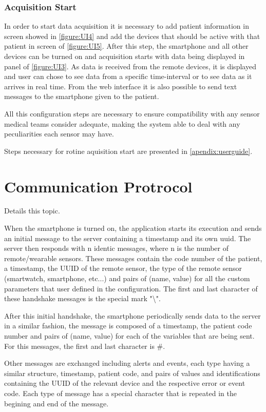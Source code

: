 \subsubsection{Acquisition Start}

In order to start data acquisition it is necessary to add patient information in screen showed in \cref{figure:UI4} and add the devices that should be active with that patient in screen of \cref{figure:UI5}. After this step, the smartphone and all other devices can be turned on and acquisition starts with data being displayed in panel of \cref{figure:UI3}. As data is received from the remote devices, it is displayed and user can chose to see data from a specific time-interval or to see data as it arrives in real time. From the web interface it is also possible to send text messages to the smartphone given to the patient.

All this configuration steps are necessary to ensure compatibility with any sensor medical teams consider adequate, making the system able to deal with any peculiarities each sensor may have.

Steps necessary for rotine aquisition start are presented in \cref{apendix:userguide}.

\section{Communication Protrocol}

 Details this topic.

When the smartphone is turned on, the application starts its execution and sends an initial message to the server containing a timestamp and its own \ac{uuid}. The server then responds with n identic messages, where n is the number of remote/wearable sensors. These messages contain the code number of the patient, a timestamp, the UUID of the remote sensor, the type of the remote sensor (smartwatch, smartphone, etc...) and pairs of (name, value) for all the custom parameters that user defined in the configuration.
The first and last character of these handshake messages is the special mark "\textbackslash".

After this initial handshake, the smartphone periodically sends data to the server in a similar fashion, the message is composed of a timestamp, the patient code number and pairs of (name, value) for each of the variables that are being sent. For this messages, the first and last character is \#.

Other messages are exchanged including alerts and events, each type having a similar structure, timestamp, patient code, and pairs of values and identifications containing the UUID of the relevant device and the respective error or event code. Each type of message has a special character that is repeated in the begining and end of the message.

